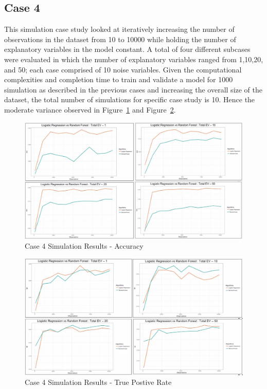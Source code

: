 \documentclass{llncs}
\begin{document}
\subsection{Case 4}

This simulation case study looked at iteratively increasing the number of observations in the dataset from 10 to 10000 while holding the number of explanatory variables in the model constant. A total of four different subcases were evaluated in which the number of explanatory variables ranged from 1,10,20, and 50; each case comprised of 10 noise variables. Given the computational complexities and completion time to train and validate a model for 1000 simulation as described in the previous cases and increasing the overall size of the dataset, the total number of simulations for specific case study is 10. Hence the moderate variance observed in Figure~\ref{fig:case4_acc_results} and Figure~\ref{fig:case4_tpr_results}. 

\begin{figure}
\centering
\includegraphics[scale=0.55]{case4_acc.png}
\caption{Case 4 Simulation Results - Accuracy}
\label{fig:case4_acc_results}
\end{figure}

\begin{figure}
\centering
\includegraphics[scale=0.55]{case4_tpr.png}
\caption{Case 4 Simulation Results - True Postive Rate}
\label{fig:case4_tpr_results}
\end{figure}
\end{document}
